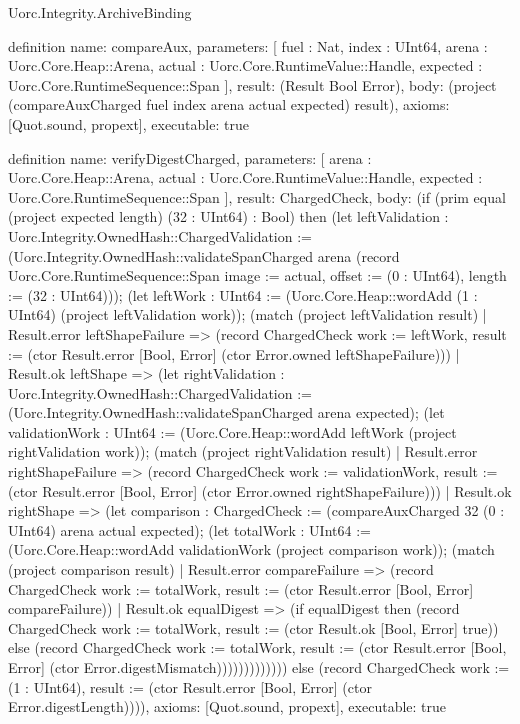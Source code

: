 \begin{lexlean}{Uorc.Integrity.ArchiveBinding}
\begin{semanticmodule}
definition{
  name: compareAux,
  parameters: [
    fuel : Nat,
    index : UInt64,
    arena : Uorc.Core.Heap::Arena,
    actual : Uorc.Core.RuntimeValue::Handle,
    expected : Uorc.Core.RuntimeSequence::Span
  ],
  result: (Result Bool Error),
  body: (project (compareAuxCharged fuel index arena actual expected) result),
  axioms: [Quot.sound, propext],
  executable: true
}

definition{
  name: verifyDigestCharged,
  parameters: [
    arena : Uorc.Core.Heap::Arena,
    actual : Uorc.Core.RuntimeValue::Handle,
    expected : Uorc.Core.RuntimeSequence::Span
  ],
  result: ChargedCheck,
  body: (if (prim equal (project expected length) (32 : UInt64) : Bool) then (let leftValidation : Uorc.Integrity.OwnedHash::ChargedValidation := (Uorc.Integrity.OwnedHash::validateSpanCharged arena (record Uorc.Core.RuntimeSequence::Span {image := actual, offset := (0 : UInt64), length := (32 : UInt64)})); (let leftWork : UInt64 := (Uorc.Core.Heap::wordAdd (1 : UInt64) (project leftValidation work)); (match (project leftValidation result)
    | Result.error leftShapeFailure => (record ChargedCheck {work := leftWork, result := (ctor Result.error [Bool, Error] (ctor Error.owned leftShapeFailure))})
    | Result.ok leftShape => (let rightValidation : Uorc.Integrity.OwnedHash::ChargedValidation := (Uorc.Integrity.OwnedHash::validateSpanCharged arena expected); (let validationWork : UInt64 := (Uorc.Core.Heap::wordAdd leftWork (project rightValidation work)); (match (project rightValidation result)
      | Result.error rightShapeFailure => (record ChargedCheck {work := validationWork, result := (ctor Result.error [Bool, Error] (ctor Error.owned rightShapeFailure))})
      | Result.ok rightShape => (let comparison : ChargedCheck := (compareAuxCharged 32 (0 : UInt64) arena actual expected); (let totalWork : UInt64 := (Uorc.Core.Heap::wordAdd validationWork (project comparison work)); (match (project comparison result)
        | Result.error compareFailure => (record ChargedCheck {work := totalWork, result := (ctor Result.error [Bool, Error] compareFailure)})
        | Result.ok equalDigest => (if equalDigest then (record ChargedCheck {work := totalWork, result := (ctor Result.ok [Bool, Error] true)}) else (record ChargedCheck {work := totalWork, result := (ctor Result.error [Bool, Error] (ctor Error.digestMismatch))}))))))))))) else (record ChargedCheck {work := (1 : UInt64), result := (ctor Result.error [Bool, Error] (ctor Error.digestLength))})),
  axioms: [Quot.sound, propext],
  executable: true
}


\end{semanticmodule}
\end{lexlean}
